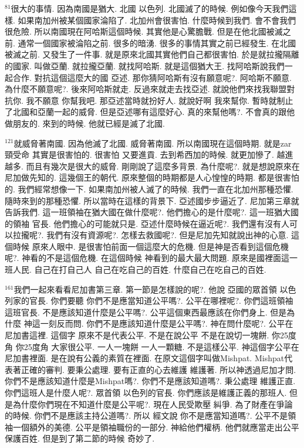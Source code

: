 \documentclass{book}
\begin{document}
$^{81}$很大的事情.
因為南國是猶大.
北國 以色列.
北國滅了的時候.
例如像今天我們這樣.
如果南加州被某個國家淪陷了.
北加州會很害怕.
什麼時候到我們.
會不會我們很危險.
所以南國現在阿哈斯這個時候.
其實他是心驚膽戰.
但是在他北國被滅之前.
通常一個國家被淪陷之前.
很多的暗湧.
很多的事情其實之前已經發生.
在北國被滅之前.
又發生了一件事.
就是原來北國其實他們自己都很害怕.
於是就拉攏隔離的國家.
叫做亞蘭.
就拉攏亞蘭.
就找阿哈斯.
就是這個猶大王.
找阿哈斯說我們一起合作.
對抗這個這麼大的國 亞述.
那你猜阿哈斯有沒有願意呢?.
阿哈斯不願意.
為什麼不願意呢?.
後來阿哈斯就走.
反過來就走去找亞述.
就說他們來找我聯盟對抗你.
我不願意 你幫我吧.
那亞述當時就扮好人.
就說好啊 我來幫你.
暫時就制止了北國和亞蘭一起的威脅.
但是亞述哪有這麼好心.
真的來幫他嗎?.
不會真的跟他做朋友的.
來到的時候.
他就已經是滅了北國.

$^{121}$就威脅著南國.
因為他滅了北國.
威脅著南國.
所以南國現在這個時期.
就是zar 頸受命 其實是很害怕的.
很害怕 又要進貢.
去到希西加的時候.
就更加慘了.
越進越多.
而且有幾次是很大的威脅.
剛剛說了這麼多背景.
為什麼呢?.
就是想說原來在尼加做先知的.
這幾個王的朝代.
原來整個的時期都是人心惶惶的時期.
都是很害怕的.
我們經常想像一下.
如果南加州被人滅了的時候.
我們一直在北加州那種恐懼.
隨時來到的那種恐懼.
所以當時在這樣的背景下.
亞述國步步逼近了.
尼加第三章就告訴我們.
這一班領袖在猶大國在做什麼呢?.
他們擔心的是什麼呢?.
這一班猶大國的領袖 官長.
他們擔心的可能就只是.
亞述什麼時候在逼近呢?.
我們還有沒有人可以拉攏呢?.
我們有沒有資源呢?.
怎樣去救國呢?.
但是尼加先知就說出神的心意.
這個時候 原來人眼中.
是很害怕前面一個這麼大的危機.
但是神是否看到這個危機呢?.
神看的不是這個危機.
在這個時候 神看到的最大最大問題.
原來是國裡面這一班人民.
自己在打自己人 自己在吃自己的百姓.
什麼自己在吃自己的百姓.

$^{161}$我們一起來看看尼加書第三章.
第一節是怎樣說的呢?.
他說 亞國的眾首領 以色列家的官長.
你們要聽 你們不是應當知道公平嗎?.
公平在哪裡呢?.
你們這班領袖 這班官長.
不是應該知道什麼是公平嗎?.
公平這個東西最應該在你們身上.
但是為什麼 神這一刻反而問.
你們不是應該知道什麼是公平嗎?.
神在問什麼呢?.
公平在尼加書這裡.
這個字 原來不是代表公平.
不是在說公平 不是在說切一塊餅.
你25度角 你25度角 大家很公平.
一人一塊餅 一人一顆糖.
不是這樣公平.
神這個字公平在尼加書裡面.
是在說有公義的素質在裡面.
在原文這個字叫做Mishpat.
Mishpat代表著正確的審判.
要秉公處理.
要有正直的心去維護 維護著.
所以神透過尼加才問.
你們不是應該知道什麼是Mishpat嗎?.
你們不是應該知道嗎?.
秉公處理 維護正直.
你們這班人是什麼人呢?.
眾首領 以色列的官長.
你們應該是維護正義的那班人.
但是為什麼你們現在不知道什麼是公平呢?.
現在人民受欺壓 糾爭.
為了財產在爭論的時候.
你們不是應該主持公道嗎?.
所以 經文說 你不是應當知道嗎?.
公平不是領袖一個額外的美德.
公平是領袖職份的一部分.
神給他們權柄.
他們就應當走出公平 保護百姓.
但是到了第二節的時候 奇妙了.
\end{document}
